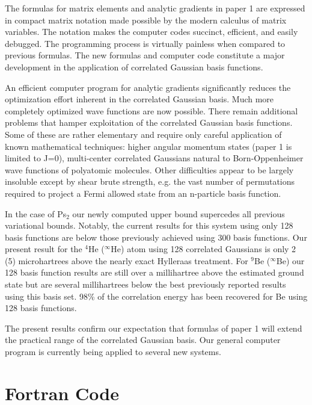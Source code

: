 \documentclass[12pt,thmsa,suthesis,verbatim]{report}
\begin{document}
The formulas for matrix elements and analytic gradients in paper 1 are
expressed in compact matrix notation made possible by the modern calculus of
matrix variables. The notation makes the computer codes succinct, efficient,
and easily debugged. The programming process is virtually painless when
compared to previous formulas. The new formulas and computer code constitute
a major development in the application of correlated Gaussian basis
functions.

An efficient computer program for analytic gradients significantly reduces
the optimization effort inherent in the correlated Gaussian basis. Much more
completely optimized wave functions are now possible. There remain
additional problems that hamper exploitation of the correlated Gaussian
basis functions. Some of these are rather elementary and require only
careful application of known mathematical techniques: higher angular
momentum states (paper 1 is limited to J=0), multi-center correlated
Gaussians natural to Born-Oppenheimer wave functions of polyatomic
molecules. Other difficulties appear to be largely insoluble except by shear
brute strength, e.g. the vast number of permutations required to project a
Fermi allowed state from an n-particle basis function.

In the case of Ps$_2$ our newly computed upper bound supercedes all previous
variational bounds. Notably, the current results for this system using only
128 basis functions are below those previously achieved using 300 basis
functions\cite{Kinghorn93}. Our present result for the $^4$He ($^\infty $He)
atom using 128 correlated Gaussians is only 2 (5) microhartrees above the
nearly exact Hylleraas treatment. For $^9$Be ($^\infty $Be) our 128 basis
function results are still over a millihartree above the estimated ground
state but are several millihartrees below the best previously reported
results using this basis set. 98\% of the correlation energy has been
recovered for Be using 128 basis functions\cite{Schwegler93}.

The present results confirm our expectation that formulas of paper 1 will
extend the practical range of the correlated Gaussian basis. Our general
computer program is currently being applied to several new systems.




\appendix 

\chapter{Fortran Code}
\end{document}
